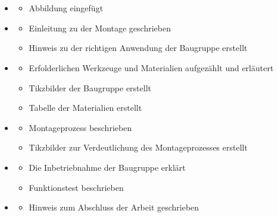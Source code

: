 \section{}
\begin{itemize}
	\item {}
    	\begin{itemize}
		\item Abbildung  eingefügt
    	\end{itemize}
	\item {}
    	\begin{itemize}
		\item Einleitung zu der Montage geschrieben
		\item Hinweis zu der richtigen Anwendung der Baugruppe erstellt
    	\end{itemize}
	\item {}
    	\begin{itemize}
		\item Erfolderlichen Werkzeuge und Materialien aufgezählt und erläutert
		\item Tikzbilder der Baugruppe erstellt
		\item Tabelle der Materialien erstellt
    	\end{itemize}
	\item {}
    	\begin{itemize}
		\item Montageprozess beschrieben
		\item Tikzbilder zur Verdeutlichung des Montageprozesses erstellt
     	\end{itemize}
	\item {}
	    \begin{itemize}
		\item Die Inbetriebnahme der Baugruppe erklärt
	    \item Funktionstest beschrieben
	    \end{itemize}
	\item {}
		\begin{itemize}
		\item Hinweis zum Abschluss der Arbeit geschrieben
    	\end{itemize}
\end{itemize}

	
	
